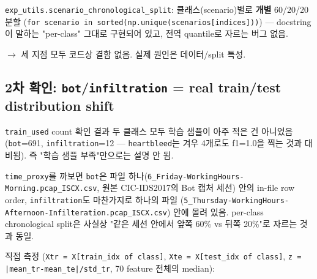 \par\noindent \textbullet\enspace \texttt{exp\_\allowbreak{}\allowbreak{}util\allowbreak{}s.\allowbreak{}scenar\allowbreak{}io\_\allowbreak{}\allowbreak{}chron\allowbreak{}ological\allowbreak{}\_\allowbreak{}\allowbreak{}split}: 클래스(scenario)별로 \textbf{개별} 60/\allowbreak{}20/\allowbreak{}20 분할 (\texttt{for scen\allowbreak{}ario in \allowbreak{}sorted(n\allowbreak{}p.\allowbreak{}unique\allowbreak{}(scenari\allowbreak{}os[indic\allowbreak{}es]))}) — docstring이 말하는 "per-class" 그대로 구현되어 있고, 전역 quantile로 자르는 버그 없음.


 \ensuremath{\rightarrow}  세 지점 모두 코드상 결함 없음. 실제 원인은 데이터/\allowbreak{}split 특성.

\subsection{2차 확인: \texttt{bot}/\allowbreak{}\texttt{infiltra\allowbreak{}tion} =\allowbreak{} real train/\allowbreak{}test distribution shift}
\texttt{train\_\allowbreak{}\allowbreak{}us\allowbreak{}ed} count 확인 결과 두 클래스 모두 학습 샘플이 아주 적은 건 아니었음 (\texttt{bot}=\allowbreak{}691, \texttt{infiltra\allowbreak{}tion}=\allowbreak{}12 — \texttt{heartble\allowbreak{}ed}는 겨우 4개로도 f1=\allowbreak{}1.0을 찍는 것과 대비됨). 즉 "학습 샘플 부족"만으로는 설명 안 됨.

\texttt{time\_\allowbreak{}\allowbreak{}pro\allowbreak{}xy}를 까보면 \texttt{bot}은 파일 하나(\texttt{6\_\allowbreak{}\allowbreak{}Friday\allowbreak{}-\allowbreak{}Working\allowbreak{}Hours-\allowbreak{}Mo\allowbreak{}rning.\allowbreak{}pc\allowbreak{}ap\_\allowbreak{}\allowbreak{}ISCX.\allowbreak{}csv}, 원본 CIC-IDS2017의 Bot 캡처 세션) 안의 in-file row order, \texttt{infiltra\allowbreak{}tion}도 마찬가지로 하나의 파일 (\texttt{5\_\allowbreak{}\allowbreak{}Thursd\allowbreak{}ay-\allowbreak{}Worki\allowbreak{}ngHours-\allowbreak{}Afternoo\allowbreak{}n-\allowbreak{}Infilt\allowbreak{}eration.\allowbreak{}pcap\_\allowbreak{}\allowbreak{}ISC\allowbreak{}X.\allowbreak{}csv}) 안에 몰려 있음. per-class chronological split은 사실상 "같은 세션 안에서 앞쪽 60\% vs 뒤쪽 20\%"로 자르는 것과 동일.

직접 측정 (\texttt{Xtr =\allowbreak{}\allowbreak{} X[\allowbreak{}train\_\allowbreak{}\allowbreak{}id\allowbreak{}x of cla\allowbreak{}ss]}, \texttt{Xte =\allowbreak{}\allowbreak{} X[\allowbreak{}test\_\allowbreak{}\allowbreak{}idx\allowbreak{} of clas\allowbreak{}s]}, \texttt{z =\allowbreak{}\allowbreak{} |mea\allowbreak{}n\_\allowbreak{}\allowbreak{}tr-\allowbreak{}mea\allowbreak{}n\_\allowbreak{}\allowbreak{}te|/\allowbreak{}\allowbreak{}st\allowbreak{}d\_\allowbreak{}\allowbreak{}tr}, 70 feature 전체의 median):

